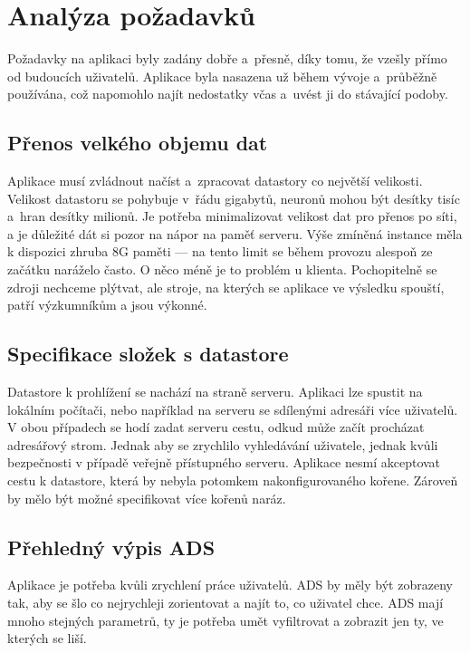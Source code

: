 \chapter{Analýza požadavků}

Požadavky na aplikaci byly zadány dobře a~přesně, díky tomu, že vzešly přímo od budoucích uživatelů. Aplikace byla nasazena už během vývoje a~průběžně používána, což napomohlo najít nedostatky včas a~uvést ji do stávající podoby.

\section{Přenos velkého objemu dat}

Aplikace musí zvládnout načíst a~zpracovat datastory co největší velikosti. Velikost datastoru se pohybuje v~řádu gigabytů, neuronů mohou být desítky tisíc a~hran desítky milionů. Je potřeba minimalizovat velikost dat pro přenos po síti, a je důležité dát si pozor na nápor na paměť serveru. Výše zmíněná instance měla k dispozici zhruba 8G paměti --- na tento limit se během provozu alespoň ze začátku naráželo často. O něco méně je to problém u klienta. Pochopitelně se zdroji nechceme plýtvat, ale stroje, na kterých se aplikace ve výsledku spouští, patří výzkumníkům a jsou výkonné.

\section{Specifikace složek s datastore}

Datastore k prohlížení se nachází na straně serveru. Aplikaci lze spustit na lokálním počítači, nebo například na serveru se sdílenými adresáři více uživatelů. V obou případech se hodí zadat serveru cestu, odkud může začít procházat adresářový strom. Jednak aby se zrychlilo vyhledávání uživatele, jednak kvůli bezpečnosti v případě veřejně přístupného serveru. Aplikace nesmí akceptovat cestu k datastore, která by nebyla potomkem nakonfigurovaného kořene. Zároveň by mělo být možné specifikovat více kořenů naráz.

\section{Přehledný výpis ADS}

Aplikace je potřeba kvůli zrychlení práce uživatelů. ADS by měly být zobrazeny tak, aby se šlo co nejrychleji zorientovat a najít to, co uživatel chce. ADS mají mnoho stejných parametrů, ty je potřeba umět vyfiltrovat a zobrazit jen ty, ve kterých se liší.

